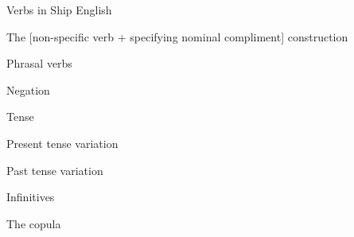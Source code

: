 \begin{listWWNumviiileveli}
\item 
\setcounter{listWWNumviiilevelii}{0}
\begin{listWWNumviiilevelii}
\item 
\begin{styleListParagraph}
Verbs in Ship English 
\end{styleListParagraph}


\setcounter{listWWNumviiileveliii}{0}
\begin{listWWNumviiileveliii}
\item 
\begin{styleListParagraph}
The [non-specific verb + specifying nominal compliment] construction
\end{styleListParagraph}

\item 
\begin{styleListParagraph}
Phrasal verbs 
\end{styleListParagraph}

\item 
\begin{styleListParagraph}
Negation
\end{styleListParagraph}

\end{listWWNumviiileveliii}
\item 
\begin{styleListParagraph}
Tense 
\end{styleListParagraph}


\setcounter{listWWNumviiileveliii}{0}
\begin{listWWNumviiileveliii}
\item 
\begin{styleListParagraph}
Present tense variation
\end{styleListParagraph}

\item 
\begin{styleListParagraph}
Past tense variation 
\end{styleListParagraph}

\item 
\begin{styleListParagraph}
Infinitives 
\end{styleListParagraph}

\end{listWWNumviiileveliii}
\item 
\begin{styleListParagraph}
The copula 
\end{styleListParagraph}



\end{listWWNumviiilevelii}
\end{listWWNumviiileveli}
